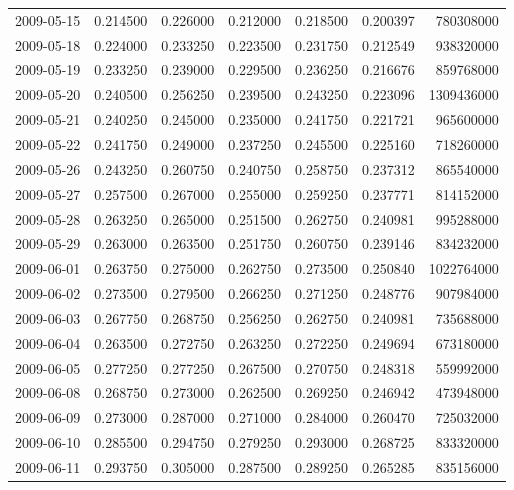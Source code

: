 \begin{tabular}{lrrrrrr}
2009-05-15 &    0.214500 &    0.226000 &    0.212000 &    0.218500 &    0.200397 &   780308000 \\
2009-05-18 &    0.224000 &    0.233250 &    0.223500 &    0.231750 &    0.212549 &   938320000 \\
2009-05-19 &    0.233250 &    0.239000 &    0.229500 &    0.236250 &    0.216676 &   859768000 \\
2009-05-20 &    0.240500 &    0.256250 &    0.239500 &    0.243250 &    0.223096 &  1309436000 \\
2009-05-21 &    0.240250 &    0.245000 &    0.235000 &    0.241750 &    0.221721 &   965600000 \\
2009-05-22 &    0.241750 &    0.249000 &    0.237250 &    0.245500 &    0.225160 &   718260000 \\
2009-05-26 &    0.243250 &    0.260750 &    0.240750 &    0.258750 &    0.237312 &   865540000 \\
2009-05-27 &    0.257500 &    0.267000 &    0.255000 &    0.259250 &    0.237771 &   814152000 \\
2009-05-28 &    0.263250 &    0.265000 &    0.251500 &    0.262750 &    0.240981 &   995288000 \\
2009-05-29 &    0.263000 &    0.263500 &    0.251750 &    0.260750 &    0.239146 &   834232000 \\
2009-06-01 &    0.263750 &    0.275000 &    0.262750 &    0.273500 &    0.250840 &  1022764000 \\
2009-06-02 &    0.273500 &    0.279500 &    0.266250 &    0.271250 &    0.248776 &   907984000 \\
2009-06-03 &    0.267750 &    0.268750 &    0.256250 &    0.262750 &    0.240981 &   735688000 \\
2009-06-04 &    0.263500 &    0.272750 &    0.263250 &    0.272250 &    0.249694 &   673180000 \\
2009-06-05 &    0.277250 &    0.277250 &    0.267500 &    0.270750 &    0.248318 &   559992000 \\
2009-06-08 &    0.268750 &    0.273000 &    0.262500 &    0.269250 &    0.246942 &   473948000 \\
2009-06-09 &    0.273000 &    0.287000 &    0.271000 &    0.284000 &    0.260470 &   725032000 \\
2009-06-10 &    0.285500 &    0.294750 &    0.279250 &    0.293000 &    0.268725 &   833320000 \\
2009-06-11 &    0.293750 &    0.305000 &    0.287500 &    0.289250 &    0.265285 &   835156000 \\

\end{tabular}
